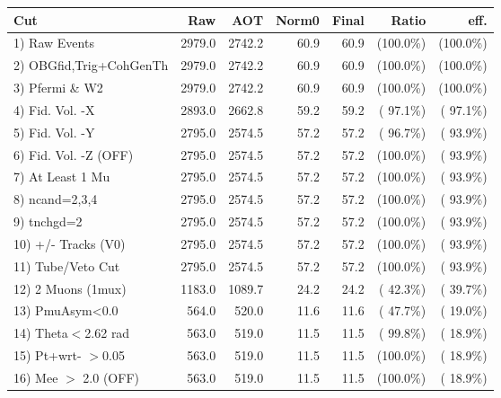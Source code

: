  \begin{table}[h!]\centering
 \begin{tabular}{||l||r|r|r|r|r|r||}
 \hline
 \hline
 Cut & Raw & AOT & Norm0 & Final & Ratio & eff.       \\
 \hline
  1) Raw Events           &       2979.0 &       2742.2 &         60.9 &         60.9 & (100.0\%) & (100.0\%) \\
  2) OBGfid,Trig+CohGenTh &       2979.0 &       2742.2 &         60.9 &         60.9 & (100.0\%) & (100.0\%) \\
  3) Pfermi \& W2         &       2979.0 &       2742.2 &         60.9 &         60.9 & (100.0\%) & (100.0\%) \\
  4) Fid. Vol. -X         &       2893.0 &       2662.8 &         59.2 &         59.2 & ( 97.1\%) & ( 97.1\%) \\
  5) Fid. Vol. -Y         &       2795.0 &       2574.5 &         57.2 &         57.2 & ( 96.7\%) & ( 93.9\%) \\
  6) Fid. Vol. -Z (OFF)   &       2795.0 &       2574.5 &         57.2 &         57.2 & (100.0\%) & ( 93.9\%) \\
  7) At Least 1 Mu        &       2795.0 &       2574.5 &         57.2 &         57.2 & (100.0\%) & ( 93.9\%) \\
  8) ncand=2,3,4          &       2795.0 &       2574.5 &         57.2 &         57.2 & (100.0\%) & ( 93.9\%) \\
  9) tnchgd=2             &       2795.0 &       2574.5 &         57.2 &         57.2 & (100.0\%) & ( 93.9\%) \\
 10) +/- Tracks (V0)      &       2795.0 &       2574.5 &         57.2 &         57.2 & (100.0\%) & ( 93.9\%) \\
 11) Tube/Veto Cut        &       2795.0 &       2574.5 &         57.2 &         57.2 & (100.0\%) & ( 93.9\%) \\
 12) 2 Muons (1mux)       &       1183.0 &       1089.7 &         24.2 &         24.2 & ( 42.3\%) & ( 39.7\%) \\
 13) PmuAsym<0.0          &        564.0 &        520.0 &         11.6 &         11.6 & ( 47.7\%) & ( 19.0\%) \\
 14) Theta$<$2.62 rad     &        563.0 &        519.0 &         11.5 &         11.5 & ( 99.8\%) & ( 18.9\%) \\
 15) Pt+wrt- $>$0.05      &        563.0 &        519.0 &         11.5 &         11.5 & (100.0\%) & ( 18.9\%) \\
 16) Mee $>$ 2.0  (OFF)   &        563.0 &        519.0 &         11.5 &         11.5 & (100.0\%) & ( 18.9\%) \\

\end{tabular}
\end{table}
